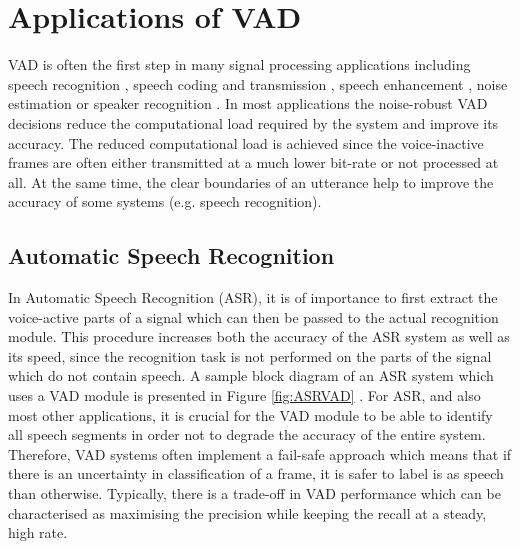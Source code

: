 

\section{Applications of VAD}

VAD is often the first step in many signal processing applications including speech recognition \cite{RamirezGorriz, Kuroiwa, Martin, Shafran, ImprovedLikelihood, LTSD}, speech coding and transmission \cite{Sohn, RamirezGorriz, Prasad, G729, GSMControl}, speech enhancement \cite{Park, RamirezGorriz, Borisagar}, noise estimation \cite{RamirezGorriz} or speaker recognition \cite{Sahidullah}. In most applications the noise-robust VAD decisions reduce the computational load required by the system and improve its accuracy. The reduced computational load is achieved since the voice-inactive frames are often either transmitted at a much lower bit-rate or not processed at all. At the same time, the clear boundaries of an utterance help to improve the accuracy of some systems (e.g. speech recognition).

\subsection{Automatic Speech Recognition}

In Automatic Speech Recognition (ASR), it is of importance to first extract the voice-active parts of a signal which can then be passed to the actual recognition module. This procedure increases both the accuracy of the ASR system as well as its speed, since the recognition task is not performed on the parts of the signal which do not contain speech. A sample block diagram of an ASR system which uses a VAD module is presented in Figure \ref{fig:ASRVAD} \cite{RamirezGorriz}. For ASR, and also most other applications, it is crucial for the VAD module to be able to identify all speech segments in order not to degrade the accuracy of the entire system. Therefore, VAD systems often implement a fail-safe approach which means that if there is an uncertainty in classification of a frame, it is safer to label is as speech than otherwise. Typically, there is a trade-off in VAD performance which can be characterised as maximising the precision while keeping the recall at a steady, high rate.

